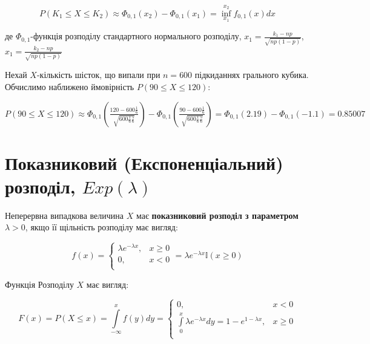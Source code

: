 \begin{equation}
    P(K_1 \leqslant X \leqslant K_2)
    \approx \Phi_{0,1}(x_2) - \Phi_{0,1}(x_1)
    = \inf\limits_{x_1}^{x_2} f_{0,1}(x)dx
\end{equation}

де $\Phi_{0,1}$-функція розподілу стандартного нормального розподілу,
$x_1 = \frac{k_1 - np}{\sqrt{np(1-p)}}$, $x_1 = \frac{k_2 - np}{\sqrt{np(1-p)}}$

\begin{example}
    Нехай $X$-кількість шісток, що випали при $n = 600$ підкиданнях грального кубика.
    Обчислимо наближено ймовірність $P(90 \leqslant X \leqslant 120)$:

    $P(90 \leqslant X \leqslant 120)
    \approx \Phi_{0,1}(\frac{120 - 600 \frac{1}{6}}{\sqrt{600 \frac{1}{6} \frac{5}{6}}})
        - \Phi_{0,1}(\frac{90 - 600 \frac{1}{6}}{\sqrt{600 \frac{1}{6} \frac{5}{6}}})
    = \Phi_{0,1}(2.19) - \Phi_{0,1}(-1.1)
    =0.85007$
\end{example}

\section{Показниковий (Експоненціальний) розподіл, $Exp(\lambda)$}

Неперервна випадкова величина $X$ має \textbf{показниковий розподіл з параметром $\lambda > 0$},
якщо її щільність розподілу має вигляд:

\begin{equation}
    f(x) = \left\{\begin{array}{ll}
        \lambda e^{-\lambda x}, & x \geqslant 0 \\
        0, & x < 0 \\
    \end{array}\right.
    = \lambda e^{-\lambda x} \mathbb{I}(x \geqslant 0)
\end{equation}

Функція Розподілу $X$ має вигляд:

\begin{equation}
    F(x) = P(X \leqslant x)
    = \int\limits_{-\infty}^{x} f(y) dy
    = \left\{\begin{array}{ll}
        0, & x < 0 \\
        \int\limits_{0}^{x}\lambda e^{-\lambda x} dy = 1 - e^{1-\lambda x}, & x \geqslant 0 \\
    \end{array}\right.
\end{equation}

